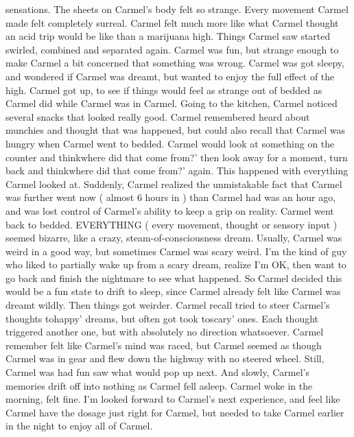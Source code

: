 \documentclass[12pt]{book}
\begin{document}
sensations. The sheets on Carmel's body felt so strange. Every movement Carmel made felt completely surreal. Carmel felt much more like what Carmel thought an acid trip would be like than a marijuana high. Things Carmel saw started swirled, combined and separated again. Carmel was fun, but strange enough to make Carmel a bit concerned that something was wrong. Carmel was got sleepy, and wondered if Carmel was dreamt, but wanted to enjoy the full effect of the high. Carmel got up, to see if things would feel as strange out of bedded as Carmel did while Carmel was in Carmel. Going to the kitchen, Carmel noticed several snacks that looked really good. Carmel remembered heard about munchies and thought that was happened, but could also recall that Carmel was hungry when Carmel went to bedded. Carmel would look at something on the counter and thinkwhere did that come from?' then look away for a moment, turn back and thinkwhere did that come from?' again. This happened with everything Carmel looked at. Suddenly, Carmel realized the unmistakable fact that Carmel was further went now ( almost 6 hours in ) than Carmel had was an hour ago, and was lost control of Carmel's ability to keep a grip on reality. Carmel went back to bedded. EVERYTHING ( every movement, thought or sensory input ) seemed bizarre, like a crazy, steam-of-consciousness dream. Usually, Carmel was weird in a good way, but sometimes Carmel was scary weird. I'm the kind of guy who liked to partially wake up from a scary dream, realize I'm OK, then want to go back and finish the nightmare to see what happened. So Carmel decided this would be a fun state to drift to sleep, since Carmel already felt like Carmel was dreamt wildly. Then things got weirder. Carmel recall tried to steer Carmel's thoughts tohappy' dreams, but often got took toscary' ones. Each thought triggered another one, but with absolutely no direction whatsoever. Carmel remember felt like Carmel's mind was raced, but Carmel seemed as though Carmel was in gear and flew down the highway with no steered wheel. Still, Carmel was had fun saw what would pop up next. And slowly, Carmel's memories drift off into nothing as Carmel fell asleep. Carmel woke in the morning, felt fine. I'm looked forward to Carmel's next experience, and feel like Carmel have the dosage just right for Carmel, but needed to take Carmel earlier in the night to enjoy all of Carmel.
\end{document}
